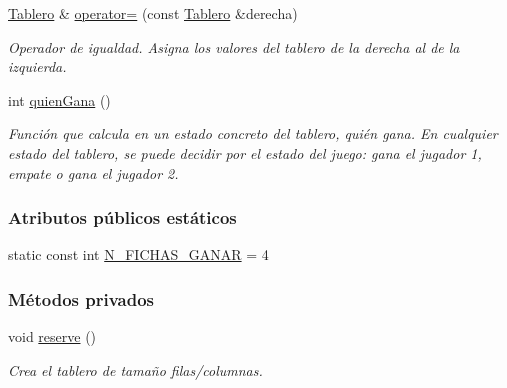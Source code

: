 \begin{DoxyCompactItemize}
\hyperlink{classTablero}{Tablero} \& \hyperlink{classTablero_abd7c6bb5bc26c0500308848399e1fd4f}{operator=} (const \hyperlink{classTablero}{Tablero} \&derecha)
\begin{DoxyCompactList}\small\item\em Operador de igualdad. Asigna los valores del tablero de la derecha al de la izquierda. \end{DoxyCompactList}\item 
int \hyperlink{classTablero_a5de543f8186142731ab3ac77944a11b1}{quien\+Gana} ()
\begin{DoxyCompactList}\small\item\em Función que calcula en un estado concreto del tablero, quién gana. En cualquier estado del tablero, se puede decidir por el estado del juego\+: gana el jugador 1, empate o gana el jugador 2. \end{DoxyCompactList}\end{DoxyCompactItemize}
\subsubsection*{Atributos públicos estáticos}
\begin{DoxyCompactItemize}
\item 
static const int \hyperlink{classTablero_aa38ed353bef45bd6c5a2e3aa4a897720}{N\+\_\+\+F\+I\+C\+H\+A\+S\+\_\+\+G\+A\+N\+AR} = 4
\end{DoxyCompactItemize}
\subsubsection*{Métodos privados}
\begin{DoxyCompactItemize}
\item 
void \hyperlink{classTablero_ac2a20883f540c4d010dafab236390cb3}{reserve} ()
\begin{DoxyCompactList}\small\item\em Crea el tablero de tamaño filas/columnas. \end{DoxyCompactList}\end{DoxyCompactItemize}
